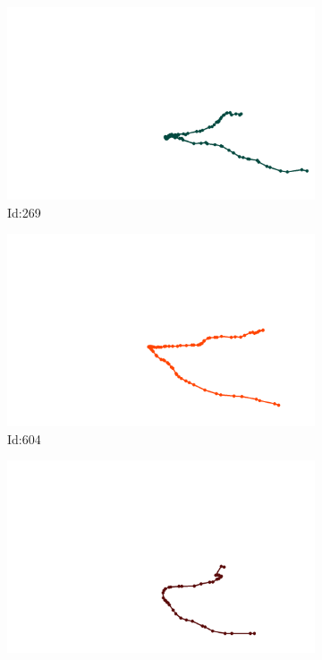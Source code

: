 \documentclass[12pt,twoside]{report}
\begin{document}
\begin{figure}
\centering
\begin{subfigure}[b]{0.20\textwidth}
\centering
\includegraphics[width=\textwidth]{../../trajectories/269.png}
\caption{Id:269}
\end{subfigure}
\begin{subfigure}[b]{0.20\textwidth}
\centering
\includegraphics[width=\textwidth]{../../trajectories/604.png}
\caption{Id:604}
\end{subfigure}
\begin{subfigure}[b]{0.20\textwidth}
\centering
\includegraphics[width=\textwidth]{../../trajectories/610.png}

\end{subfigure}
\end{figure}
\end{document}
